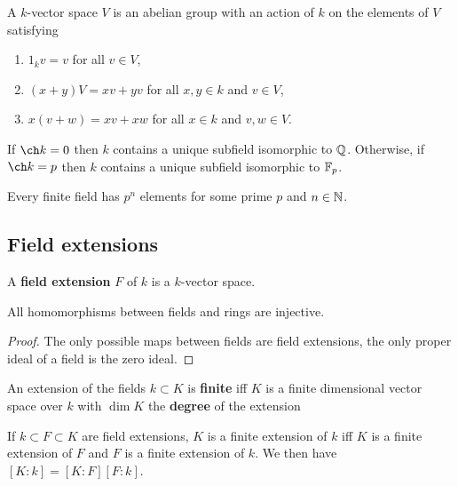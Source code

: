\documentclass[../Year2.tex]{subfiles}
\begin{document}
\begin{definition}
    A $k$-vector space $V$ is an abelian group with an action of $k$ on the elements of $V$ satisfying \begin{enumerate}
        \item $1_k v=v$ for all $v\in V$,
        \item $(x+y)V = xv + yv$ for all $x,y\in k$ and $v\in V$,
        \item $x(v+w) = xv + xw$ for all $x\in k$ and $v,w\in V$.
    \end{enumerate}
\end{definition}

\begin{proposition}
    If $\ch k=0$ then $k$ contains a unique subfield isomorphic to $\mathbb{Q}$. Otherwise, if $\ch k = p$ then $k$ contains a unique subfield isomorphic to $\mathbb{F}_p$.
\end{proposition}

\begin{theorem}
    Every finite field has $p^n$ elements for some prime $p$ and $n\in\mathbb{N}$.
\end{theorem}

\subsection{Field extensions}

\begin{definition}
    A \textbf{field extension} $F$ of $k$ is a $k$-vector space.
\end{definition}

\begin{proposition}
    All homomorphisms between fields and rings are injective.
    \begin{proof}
        The only possible maps between fields are field extensions, the only proper ideal of a field is the zero ideal.
    \end{proof}
\end{proposition}

\begin{definition}
    An extension of the fields $k\subset K$ is \textbf{finite} iff $K$ is a finite dimensional vector space over $k$ with $\dim K$ the \textbf{degree} of the extension
\end{definition}

\begin{theorem}
    If $k\subset F\subset K$ are field extensions, $K$ is a finite extension of $k$ iff $K$ is a finite extension of $F$ and $F$ is a finite extension of $k$. We then have $[K:k]=[K:F][F:k]$.
\end{theorem}
\end{document}
